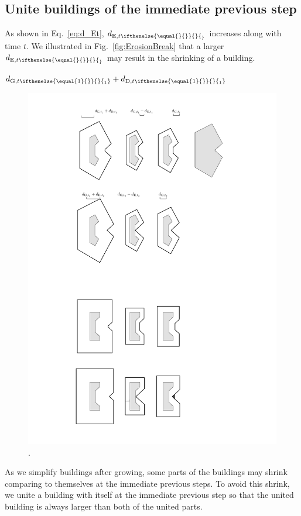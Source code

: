 \documentclass[graybox]{svmult}
\newcommand{\fig}{Fig.~}
\newcommand{\eq}{Eq.~}
\newcommand{\dtrm}[2][]{d_{\mathrm{#2}, t\ifthenelse{\equal{#1}{}}{}{_#1}}}
\begin{document}
\subsection{Unite buildings of the immediate previous step}
\label{sec:Unite}

As shown in \eq\ref{eq:d_Et}, $\dtrm{E}$ increases along with time $t$.
We illustrated in \fig\ref{fig:ErosionBreak} that 
a larger $\dtrm{E}$ may result in the shrinking of a building.

$\dtrm[1]{G} + \dtrm[1]{D}$

\begin{figure}[tb]
	\centering
	\includegraphics[draft=false]{Shrink_Erosion}
	\caption{.
	}
	\label{fig:Shrink_Erosion}
\end{figure}


As we simplify buildings after growing, 
some parts of the buildings may shrink 
comparing to themselves at the immediate previous steps.
To avoid this shrink, we unite a building with itself at the immediate previous 
step so that the 
united building is always larger than both of the united parts.
\end{document}
